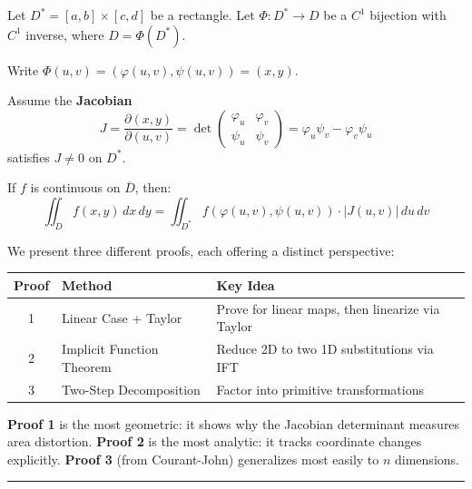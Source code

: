 \documentclass[11pt]{report}
\begin{document}
\begin{theorem}
\label{thm:cov-rectangle}
Let $D^* = [a,b] \times [c,d]$ be a rectangle. Let $\Phi: D^* \to D$ be a $C^1$ bijection with $C^1$ inverse, where $D = \Phi(D^*)$.

Write $\Phi(u, v) = (\varphi(u, v), \psi(u, v)) = (x, y)$.

Assume the \textbf{Jacobian}
\[
J = \frac{\partial(x, y)}{\partial(u, v)} = \det \begin{pmatrix} \varphi_u & \varphi_v \\ \psi_u & \psi_v \end{pmatrix} = \varphi_u \psi_v - \varphi_v \psi_u
\]
satisfies $J \neq 0$ on $D^*$.

If $f$ is continuous on $\overline{D}$, then:
\[
\boxed{\iint_D f(x, y) \, dx \, dy = \iint_{D^*} f(\varphi(u, v), \psi(u, v)) \cdot |J(u, v)| \, du \, dv}
\]
\end{theorem}

We present three different proofs, each offering a distinct perspective:

\begin{center}
\renewcommand{\arraystretch}{1.4}
\begin{tabular}{|c|l|l|}
\hline
\textbf{Proof} & \textbf{Method} & \textbf{Key Idea} \\
\hline
1 & Linear Case + Taylor & Prove for linear maps, then linearize via Taylor \\
\hline
2 & Implicit Function Theorem & Reduce 2D to two 1D substitutions via IFT \\
\hline
3 & Two-Step Decomposition & Factor into primitive transformations \\
\hline
\end{tabular}
\end{center}

\medskip

\noindent\textbf{Proof 1} is the most geometric: it shows why the Jacobian determinant measures area distortion. \textbf{Proof 2} is the most analytic: it tracks coordinate changes explicitly. \textbf{Proof 3} (from Courant-John) generalizes most easily to $n$ dimensions.

\bigskip
\hrule
\bigskip
\end{document}
